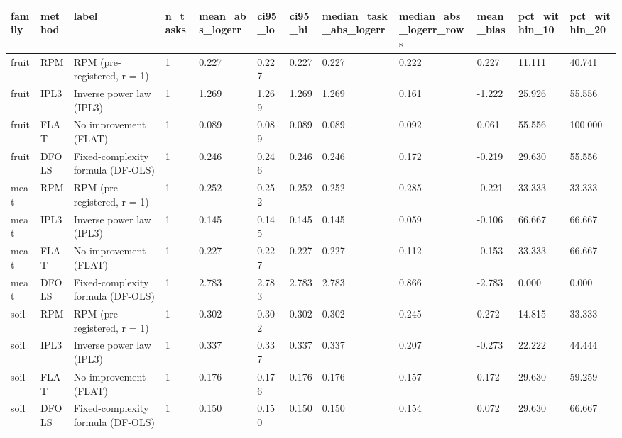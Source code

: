 \begin{tabular}{llllllllllll}
\hline
family & method & label & n\_tasks & mean\_abs\_logerr & ci95\_lo & ci95\_hi & median\_task\_abs\_logerr & median\_abs\_logerr\_rows & mean\_bias & pct\_within\_10 & pct\_within\_20 \\
\hline
fruit & RPM & RPM (pre-registered, r = 1) & 1 & 0.227 & 0.227 & 0.227 & 0.227 & 0.222 & 0.227 & 11.111 & 40.741 \\
fruit & IPL3 & Inverse power law (IPL3) & 1 & 1.269 & 1.269 & 1.269 & 1.269 & 0.161 & -1.222 & 25.926 & 55.556 \\
fruit & FLAT & No improvement (FLAT) & 1 & 0.089 & 0.089 & 0.089 & 0.089 & 0.092 & 0.061 & 55.556 & 100.000 \\
fruit & DFOLS & Fixed-complexity formula (DF-OLS) & 1 & 0.246 & 0.246 & 0.246 & 0.246 & 0.172 & -0.219 & 29.630 & 55.556 \\
meat & RPM & RPM (pre-registered, r = 1) & 1 & 0.252 & 0.252 & 0.252 & 0.252 & 0.285 & -0.221 & 33.333 & 33.333 \\
meat & IPL3 & Inverse power law (IPL3) & 1 & 0.145 & 0.145 & 0.145 & 0.145 & 0.059 & -0.106 & 66.667 & 66.667 \\
meat & FLAT & No improvement (FLAT) & 1 & 0.227 & 0.227 & 0.227 & 0.227 & 0.112 & -0.153 & 33.333 & 66.667 \\
meat & DFOLS & Fixed-complexity formula (DF-OLS) & 1 & 2.783 & 2.783 & 2.783 & 2.783 & 0.866 & -2.783 & 0.000 & 0.000 \\
soil & RPM & RPM (pre-registered, r = 1) & 1 & 0.302 & 0.302 & 0.302 & 0.302 & 0.245 & 0.272 & 14.815 & 33.333 \\
soil & IPL3 & Inverse power law (IPL3) & 1 & 0.337 & 0.337 & 0.337 & 0.337 & 0.207 & -0.273 & 22.222 & 44.444 \\
soil & FLAT & No improvement (FLAT) & 1 & 0.176 & 0.176 & 0.176 & 0.176 & 0.157 & 0.172 & 29.630 & 59.259 \\
soil & DFOLS & Fixed-complexity formula (DF-OLS) & 1 & 0.150 & 0.150 & 0.150 & 0.150 & 0.154 & 0.072 & 29.630 & 66.667 \\
\hline
\end{tabular}
